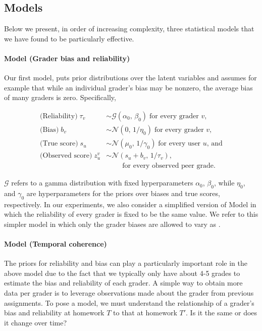 \subsection{Models}
Below we present, in order of increasing complexity, three statistical models that we have found to be particularly effective.

\paragraph{Model \PGone (Grader bias and reliability)}
Our first model, \PGone puts prior distributions over the latent variables and
assumes for example that while an individual grader's bias may be nonzero,
the average bias of many graders is zero.
Specifically, 

{\footnotesize
\begin{align*}
\mbox{(Reliability)}\; \tau_v &\sim  \mathcal{G}(\alpha_0,\,\beta_0) \;\mbox{for every grader $v$},\\
\mbox{(Bias)}\;b_v &\sim \mathcal{N}(0,\,1/\eta_0) \;\mbox{for every grader $v$},\\
\mbox{(True score)}\;s_u&\sim \mathcal{N}(\mu_0,\,1/\gamma_0)  \;\mbox{for every user $u$, and}\\
\mbox{(Observed score)}\;z^v_u &\sim \mathcal{N}( s_u + b_v,\, 1/\tau_v ), \\
       &\qquad \;\mbox{for every observed peer grade.} 
\end{align*}
}

$\mathcal{G}$ refers to a gamma distribution with fixed hyperparameters $\alpha_0$, $\beta_0$, while
$\eta_0$, and $\gamma_0$ are hyperparameters for the priors over biases and true scores, respectively.
In our experiments, we also consider a simplified version of
Model \PGone in which the reliability of every grader is fixed
to be the same value. We refer to this simpler model in which
only the grader biases are allowed to vary as \PGonebias. 


\paragraph{Model \PGtwo (Temporal coherence)}
The priors for reliability and bias can play a particularly important role in the above model
due to the fact that we typically only have about 4-5 grades to estimate the bias and reliability
of each grader.  A simple way to obtain more data per grader %
is to leverage observations made about the grader from previous assignments.  To pose a model, we must understand the relationship
of a grader's bias and reliability at homework $T$ to that at homework $T'$.  Is it the same or does it change over time?

